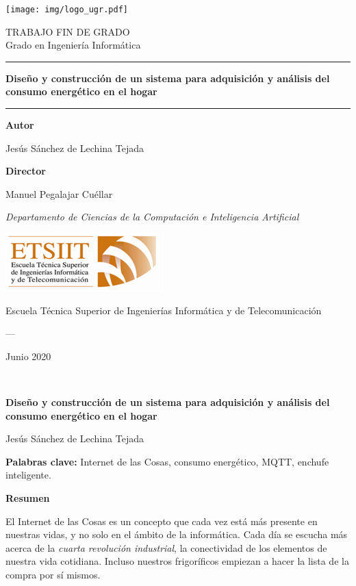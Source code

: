 \documentclass[a4paper,10pt]{article}
\newcommand{\inserttitle}{Diseño y construcción de un sistema para adquisición y análisis
  del consumo energético en el hogar}
\newcommand{\insertauthor}{Jesús Sánchez de Lechina Tejada}
\newcommand{\insertdate}{Junio 2020}
\begin{document}
\begin{titlepage}
\begin{center}
  \texttt{[image: img/logo\_ugr.pdf]}
\end{center}

\begin{center}
  \Large TRABAJO FIN DE GRADO\\ 
  \large Grado en Ingeniería Informática
  \vspace{0.7cm}

  \hrule
  \textbf{\LARGE \inserttitle}
  \vspace{0.2cm}
  \hrule
  \vspace{2cm}
  
  \textbf{Autor}

  \insertauthor

  \textbf{Director}

  Manuel Pegalajar Cuéllar

  \textit{Departamento de Ciencias de la Computación e Inteligencia Artificial}

  \vspace{2cm}
  \includegraphics{img/etsiit_logo.png}
  
  Escuela Técnica Superior de Ingenierías Informática y de Telecomunicación

  \textsc{---}

  \insertdate
\end{center}

\newpage

\ 
\thispagestyle{empty}

\newpage

\begin{center}
\textbf{\inserttitle}


Jesús Sánchez de Lechina Tejada
\end{center}

\textbf{Palabras clave:} Internet de las Cosas, consumo energético, MQTT, enchufe inteligente.

\textbf{Resumen}

El Internet de las Cosas es un concepto que cada vez está más presente
en nuestras vidas, y no solo en el ámbito de la informática. Cada día
se escucha más acerca de la \emph{cuarta revolución industrial}, la
conectividad de los elementos de nuestra vida cotidiana. Incluso
nuestros frigoríficos empiezan a hacer la lista de la compra por sí
mismos.


\end{titlepage}
\end{document}
